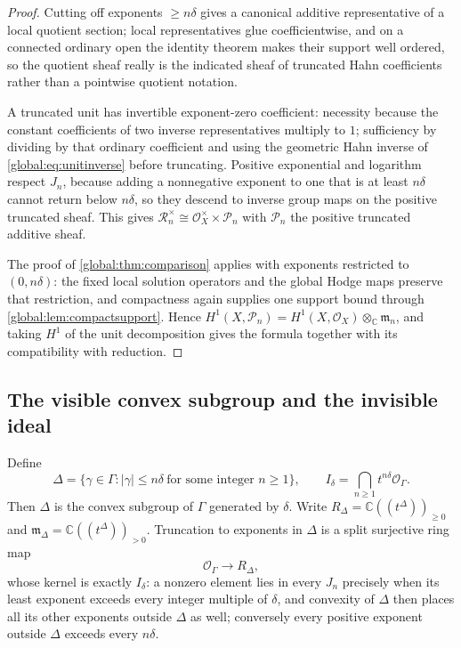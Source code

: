 \documentclass[11pt,letterpaper]{article}
\theoremstyle{definition}
\theoremstyle{remark}
\newcommand{\C}{\mathbb C}
\newcommand{\OO}{\mathcal O}
\numberwithin{equation}{section}
\begin{document}
\begin{proof}
Cutting off exponents $\ge n\delta$ gives a canonical additive representative of a local quotient section; local representatives glue coefficientwise, and on a connected ordinary open the identity theorem makes their support well ordered, so the quotient sheaf really is the indicated sheaf of truncated Hahn coefficients rather than a pointwise quotient notation.

A truncated unit has invertible exponent-zero coefficient: necessity because the constant coefficients of two inverse representatives multiply to $1$; sufficiency by dividing by that ordinary coefficient and using the geometric Hahn inverse of \eqref{global:eq:unitinverse} before truncating. Positive exponential and logarithm respect $J_n$, because adding a nonnegative exponent to one that is at least $n\delta$ cannot return below $n\delta$, so they descend to inverse group maps on the positive truncated sheaf. This gives $\mathscr R_n^\times\cong\OO_X^\times\times\mathscr P_n$ with $\mathscr P_n$ the positive truncated additive sheaf.

The proof of \cref{global:thm:comparison} applies with exponents restricted to $(0,n\delta)$: the fixed local solution operators and the global Hodge maps preserve that restriction, and compactness again supplies one support bound through \cref{global:lem:compactsupport}. Hence $H^1(X,\mathscr P_n)=H^1(X,\OO_X)\otimes_\C\mathfrak m_n$, and taking $H^1$ of the unit decomposition gives the formula together with its compatibility with reduction.
\end{proof}

\subsection{The visible convex subgroup and the invisible ideal}

Define
\begin{equation}\label{global:eq:DeltaI}
  \Delta=\{\gamma\in\Gamma:|\gamma|\le n\delta\ \text{for some integer }n\ge1\},
  \qquad
  I_\delta=\bigcap_{n\ge1}t^{n\delta}\OO_\Gamma .
\end{equation}
Then $\Delta$ is the convex subgroup of $\Gamma$ generated by $\delta$. Write $R_\Delta=\C((t^\Delta))_{\ge0}$ and $\mathfrak m_\Delta=\C((t^\Delta))_{>0}$. Truncation to exponents in $\Delta$ is a split surjective ring map
\begin{equation}\label{global:eq:convexcut}
  \OO_\Gamma\longrightarrow R_\Delta,
\end{equation}
whose kernel is exactly $I_\delta$: a nonzero element lies in every $J_n$ precisely when its least exponent exceeds every integer multiple of $\delta$, and convexity of $\Delta$ then places all its other exponents outside $\Delta$ as well; conversely every positive exponent outside $\Delta$ exceeds every $n\delta$.
\end{document}
